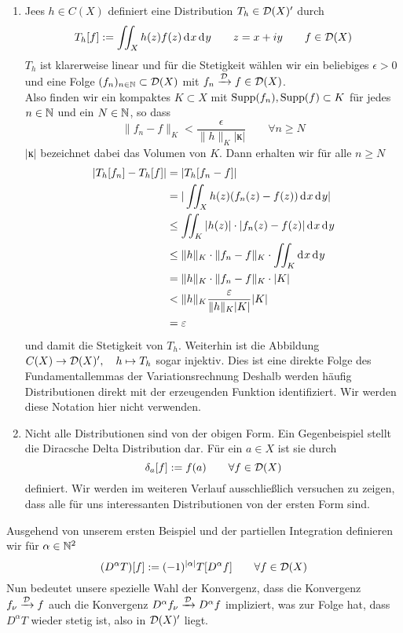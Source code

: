 \begin{bsp}
  \begin{enumerate}
  \item Jees $h \in C(X)$ definiert eine Distribution $T_h \in
    \mathcal{D}(X)'$ durch
    \[
    T_h[f] := \iint_X h(z) f(z) \d[x]\d[y] \qquad z = x+iy \qquad f
    \in \dist(X)
    \]
    $T_h$ ist klarerweise linear und für die Stetigkeit wählen wir ein
    beliebiges $\epsilon > 0$ und eine Folge $(f_n)_{n \in\mathbb{N}} \subset
    \mathcal{D}(X)$ mit $f_n \xrightarrow{\mathcal{D}} f \in \mathcal{D}(X)$. \\
    Also finden wir ein kompaktes $K \subset X$ mit $\operatorname{Supp}(f_n),
    \operatorname{Supp}(f) \subset K$ für jedes $n \in \mathbb{N}$ und ein $N \in \mathbb{N}$, so
    dass
    \[
    \|f_n -f\|_K < \frac{\epsilon}{\|h\|_K |ĸ|} \qquad \forall n \geq N
    \]
    $|ĸ|$ bezeichnet dabei das Volumen von $K$. Dann erhalten wir für
    alle $n \geq N$
    \begin{align*}
      |T_h[f_n] - T_h[f]| & = | T_h[f_n -f]| \\
      & = | \iint_X h(z) (f_n(z) - f(z)) \d[x]\d[y]| \\
      & \leq \iint_K |h(z)| \cdot |f_n(z) - f(z)| \d[x]\d[y]\\
      & \leq \|h\|_K \cdot\|f_n - f\|_K \cdot \iint_K \d[x] \d[y] \\
      & = \|h\|_K \cdot \|f_n - f\|_K \cdot |K| \\
      & < \|h\|_K \frac{\epsilon}{\|h\|_K |K|} |K| \\
      & = \epsilon
    \end{align*}
    und damit die Stetigkeit von $T_h$.
    Weiterhin ist die Abbildung $C(X) \rightarrow \mathcal{D}(X)', \quad h \mapsto
    T_h$ sogar injektiv. Dies ist eine direkte Folge des 
    Fundamentallemmas der Variationsrechnung Deshalb werden häufig
    Distributionen direkt mit der erzeugenden Funktion
    identifiziert. Wir werden diese Notation hier nicht verwenden.
  \item Nicht alle Distributionen sind von der obigen Form. Ein
    Gegenbeispiel stellt die Diracsche Delta Distribution dar. Für ein
    $a \in X$ ist sie durch
    \[
    \delta_a[f] := f(a) \qquad \forall f \in \mathcal{D}(X)
    \]
    definiert. Wir werden im weiteren Verlauf ausschließlich versuchen
    zu zeigen, dass alle für uns interessanten Distributionen von der
    ersten Form sind.
  \end{enumerate}
\end{bsp}

\begin{defin} 
  Ausgehend von unserem ersten Beispiel und der partiellen Integration
  definieren wir für $\alpha \in \mathbb{N}^2$
  \[
  (D^\alpha T)[f] := (-1)^{|\alpha|} T[D^\alpha f] \qquad \forall f
  \in \mathcal{D}(X)
  \]
  Nun bedeutet unsere spezielle Wahl der Konvergenz, dass die
  Konvergenz $f_\nu \xrightarrow{\mathcal{D}} f$ auch die Konvergenz
  $D^\alpha f_\nu \xrightarrow{\mathcal{D}} D^\alpha f$ impliziert, was zur
  Folge hat, dass $D^\alpha T$ wieder stetig ist, also in $\mathcal{D}(X)'$ liegt.
\end{defin}

